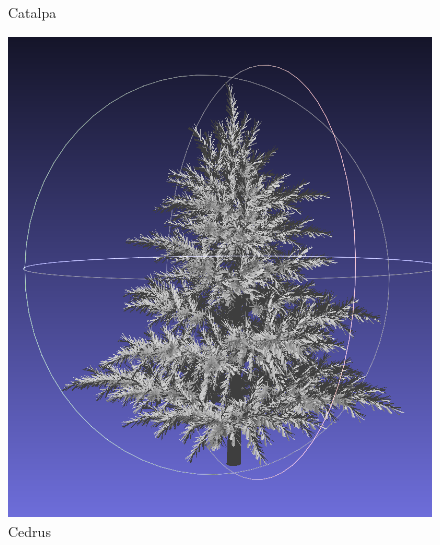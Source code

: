 \documentclass[12pt]{article}
\begin{document}
\begin{figure}[H]
\begin{minipage}{0.24\textwidth}
        \caption{Catalpa}
    \end{minipage}
\end{figure}

\begin{figure}[H]
    \centering
    \begin{minipage}{0.24\textwidth}
        \centering
        \includegraphics[width=\textwidth]{images/cedrus.png}
        \caption{Cedrus}
    \end{minipage}\hfill
    \begin{minipage}{0.24\textwidth}
        \centering

\end{minipage}
\end{figure}
\end{document}
